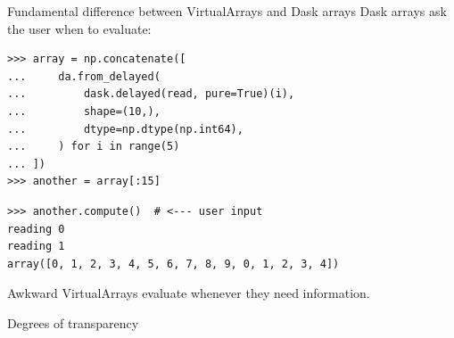 \documentclass[aspectratio=169]{beamer}
\begin{document}
\begin{frame}[fragile]{Fundamental difference between VirtualArrays and Dask arrays}
\Large
\vspace{0.25 cm}
Dask arrays ask the user when to evaluate:

\small
\begin{verbatim}
>>> array = np.concatenate([
...     da.from_delayed(
...         dask.delayed(read, pure=True)(i),
...         shape=(10,),
...         dtype=np.dtype(np.int64),
...     ) for i in range(5)
... ])
>>> another = array[:15]
\end{verbatim}
\begin{verbatim}
>>> another.compute()  # <--- user input
reading 0
reading 1
array([0, 1, 2, 3, 4, 5, 6, 7, 8, 9, 0, 1, 2, 3, 4])
\end{verbatim}

\Large
\vspace{0.5 cm}
Awkward VirtualArrays evaluate whenever they need information.
\end{frame}

\begin{frame}{Degrees of transparency}
\vspace{0.25 cm}
\end{frame}
\end{document}
